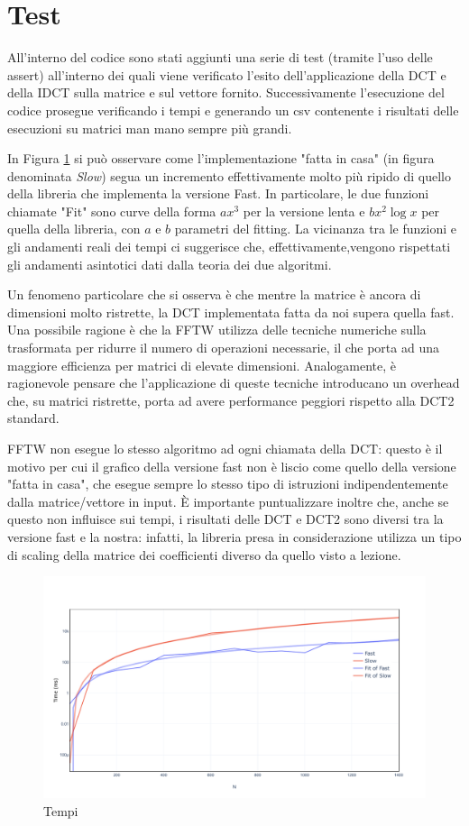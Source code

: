 \section{Test}

All'interno del codice sono stati aggiunti una serie di test (tramite l'uso delle assert) all'interno dei quali viene verificato l'esito dell'applicazione della DCT e della IDCT sulla matrice e sul vettore fornito. Successivamente l'esecuzione del codice prosegue verificando i tempi e generando un csv contenente i risultati delle esecuzioni su matrici man mano sempre più grandi.

In Figura \ref{fig:timings} si può osservare come l'implementazione "fatta in casa" (in figura denominata \textit{Slow}) segua un incremento effettivamente molto più ripido di quello della libreria che implementa la versione Fast. In particolare, le due funzioni chiamate "Fit" sono curve della forma $ax^3$ per la versione lenta e $bx^2 \log{x}$  per quella della libreria, con $a$ e $b$ parametri del fitting. La vicinanza tra le funzioni e gli andamenti reali dei tempi ci suggerisce che, effettivamente,vengono rispettati gli andamenti asintotici dati dalla teoria dei due algoritmi.
 
 Un fenomeno particolare che si osserva è che mentre la matrice è ancora di dimensioni molto ristrette, la DCT implementata fatta da noi supera quella fast. Una possibile ragione è che la FFTW utilizza delle tecniche numeriche sulla trasformata per ridurre il numero di operazioni necessarie, il che porta ad una maggiore efficienza per matrici di elevate dimensioni. Analogamente, è ragionevole pensare che l'applicazione di queste tecniche introducano un overhead che, su matrici ristrette, porta ad avere performance peggiori rispetto alla DCT2 standard.

FFTW non esegue lo stesso algoritmo ad ogni chiamata della DCT: questo è il motivo per cui il grafico della versione fast non è liscio come quello della versione "fatta in casa", che esegue sempre lo stesso tipo di istruzioni indipendentemente dalla matrice/vettore in input.
È importante puntualizzare inoltre che, anche se questo non influisce sui tempi, i risultati delle DCT e DCT2 sono diversi tra la versione fast e la nostra: infatti, la libreria presa in considerazione utilizza un tipo di scaling della matrice dei coefficienti diverso da quello visto a lezione.

\begin{figure}[ht]
	\centering
	\includegraphics[width=\textwidth]{figures/timings}
	\caption{Tempi}
	\label{fig:timings}	
\end{figure}

\FloatBarrier